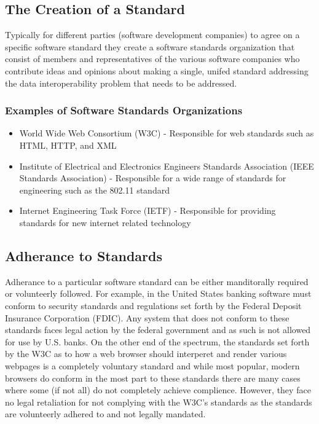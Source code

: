 \documentclass[12pt]{article}
\begin{document}
\subsection{The Creation of a Standard}
Typically for different parties (software development companies) to agree on a specific software standard they create a software standards organization that consist of members and representatives of the various software companies who contribute ideas and opinions about making a single, unifed standard addressing the data interoperability problem that needs to be addressed.

\subsubsection{ Examples of Software Standards Organizations}

\begin{itemize}
\item World Wide Web Consortium (W3C) - Responsible for web standards such as HTML, HTTP, and XML 
\item Institute of Electrical and Electronics Engineers Standards Association (IEEE Standards Association) - Responsible for a wide range of standards for engineering such as the 802.11 standard
\item Internet Engineering Task Force (IETF) - Responsible for providing standards for new internet related technology 
\end{itemize}

\subsection{ Adherance to Standards}
Adherance to a particular software standard can be either manditorally required or volunteerly followed. For example, in the United States banking software must conform to security standards and regulations set forth by the Federal Deposit Insurance Corporation (FDIC). Any system that does not conform to these standards faces legal action by the federal government and as such is not allowed for use by U.S. banks. On the other end of the spectrum, the standards set forth by the W3C as to how a web browser should interperet and render various webpages is a completely voluntary standard and while most popular, modern browsers do conform in the most part to these standards there are many cases where some (if not all) do not completely achieve complience. However, they face no legal retaliation for not complying with the W3C's standards as the standards are volunteerly adhered to and not legally mandated.
\end{document}
